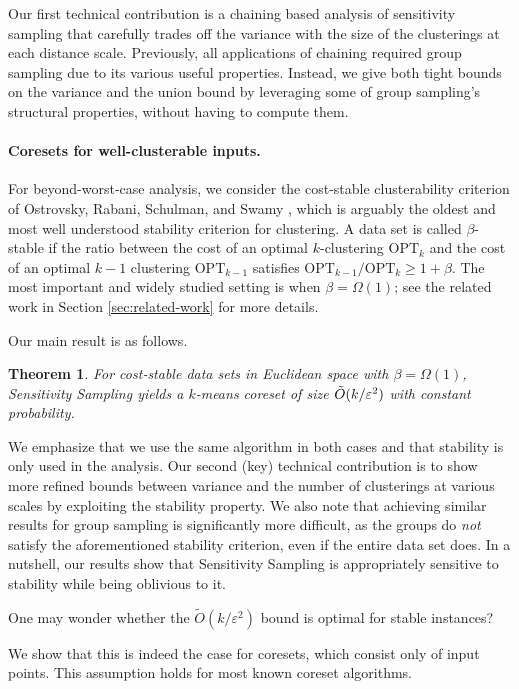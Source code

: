 \documentclass[11pt]{article}
\newtheorem{theorem}{Theorem}
\theoremstyle{restate}
\theoremstyle{definition}
\begin{document}
Our first technical contribution is a chaining based analysis of sensitivity sampling that carefully trades off the variance with the size of the clusterings at each distance scale.
Previously, all applications of chaining required group sampling due to its various useful properties. Instead, we give both tight bounds on the variance and the union bound by leveraging some of group sampling's structural properties, without having to compute them.


\paragraph{Coresets for well-clusterable inputs.}
For beyond-worst-case analysis, we consider the cost-stable clusterability criterion of Ostrovsky, Rabani, Schulman, and Swamy \cite{ORSS12}, which is arguably the oldest and most well understood stability criterion for clustering. A data set is called $\beta$-stable if the ratio between the cost of an optimal $k$-clustering $\text{OPT}_k$ and the cost of an optimal $k-1$ clustering $\text{OPT}_{k-1}$ satisfies $ \text{OPT}_{k-1}/{\text{OPT}_k} \geq 1+\beta$. The most important and widely studied setting is when $\beta= \Omega(1)$; see the related work  in Section \ref{sec:related-work} for more details. 

Our main result is as follows.
\begin{theorem}\label{thm: main-coreset-thm}
For cost-stable data sets in Euclidean space with $\beta= \Omega(1)$, Sensitivity Sampling yields a $k$-means coreset of size $\Tilde{O}(k/\varepsilon^2)$ with constant probability.
\end{theorem}
We emphasize that we use the same algorithm in both cases and that stability is only used in the analysis. Our second (key) technical contribution is to show more refined bounds between variance and the number of clusterings at various scales by exploiting the stability property.
We also note that achieving similar results for group sampling is significantly more difficult, as the groups do \emph{not} satisfy the aforementioned stability criterion, even if the entire data set does.
In a nutshell, our results show that Sensitivity Sampling is appropriately sensitive to stability while being oblivious to it.





One may wonder whether the $\tilde{O}(k/\varepsilon^2)$ bound is optimal for stable instances?

We show that this is indeed the case for coresets, which consist only of input points.
This assumption holds for most known coreset algorithms.
\end{document}
